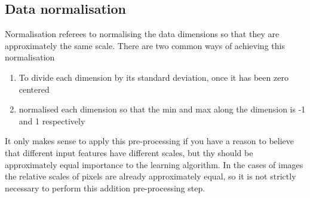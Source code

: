 \subsection{Data normalisation}
Normalisation referees to normalising the data dimensions so that they are approximately the same scale. There are two common ways of achieving this normalisation
\begin{enumerate}
    \item To divide each dimension by its standard deviation, once it has been zero centered
    \item normalised each dimension so that the min and max along the dimension is -1 and 1 respectively
\end{enumerate}
It only makes sense to apply this pre-processing if you have a reason to believe that different input features have different scales, but thy should be approximately equal importance to the learning algorithm. In the cases of images the relative scales of pixels are already approximately equal, so it is not strictly necessary to perform this addition pre-processing step.